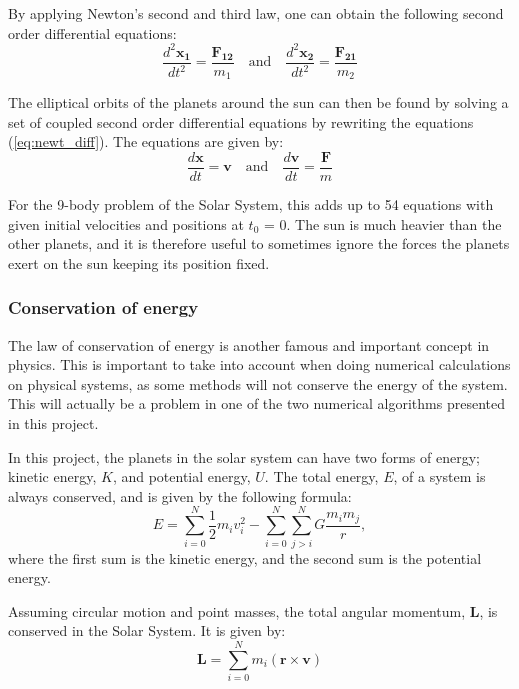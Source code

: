 \documentclass[10pt,a4paper,titlepage]{article}
\begin{document}
By applying Newton's second and third law, one can obtain the following second order differential equations:
\begin{equation}
\label{eq:newt_diff}
\frac{d^2\mathbf{x_1}}{dt^2} = \frac{\mathbf{F_{12}}}{m_1} \quad \mathrm{and} \quad \frac{d^2\mathbf{x_2}}{dt^2} = \frac{\mathbf{F_{21}}}{m_2}
\end{equation}

The elliptical orbits of the planets around the sun can then be found by solving a set of coupled second order differential equations by rewriting the equations (\ref{eq:newt_diff}). The equations are given by:
\begin{equation}
\frac{d\mathbf{x}}{dt}=\mathbf{v} \quad  \mathrm{and} \quad \frac{d\mathbf{v}}{dt}=\frac{\mathbf{F}}{m}
\end{equation}

For the 9-body problem of the Solar System, this adds up to 54 equations with given initial velocities and positions at $t_0$ = 0. The sun is much heavier than the other planets, and it is therefore useful to sometimes ignore the forces the planets exert on the sun keeping its position fixed. 

\subsubsection{Conservation of energy}
The law of conservation of energy is another famous and important concept in physics. This is important to take into account when doing numerical calculations on physical systems, as some methods will not conserve the energy of the system. This will actually be a problem in one of the two numerical algorithms presented in this project. 

In this project, the planets in the solar system can have two forms of energy; kinetic energy, $K$, and potential energy, $U$. The total energy, $E$, of a system is always conserved, and is given by the following formula:
\begin{equation}
\label{eq:totalE}
E = \sum_{i=0}^{N}\frac{1}{2}m_i v_i^2-\sum_{i=0}^{N}\sum_{j>i}^{N}G\frac{m_im_j}{r},
\end{equation}
where the first sum is the kinetic energy, and the second sum is the potential energy. 

Assuming circular motion and point masses, the total angular momentum, $\mathbf{L}$, is conserved in the Solar System. It is given by:
\begin{equation}
\mathbf{L}=\sum_{i=0}^{N}m_{i}(\mathbf{r}\times\mathbf{v})
\end{equation}
\end{document}
